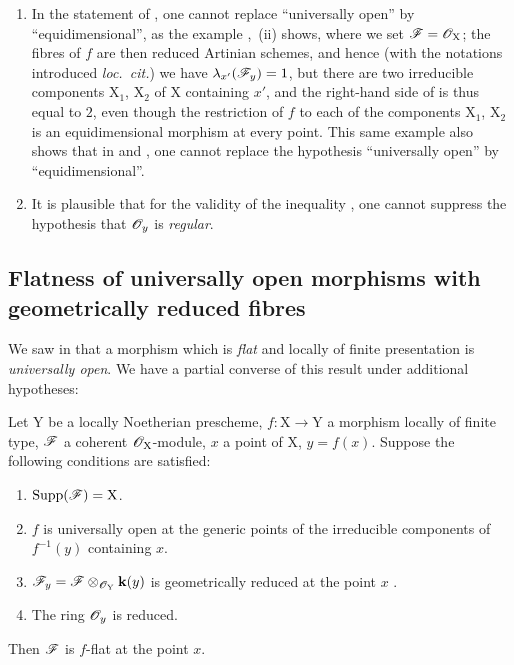 \begin{remarks}[15.1.4]
\label{IV.15.1.4}
\begin{enumerate}[label=(\roman*)]
  \item In the statement of , one cannot replace ``universally open'' by ``equidimensional'', as the example ,~(ii) shows, where we set $\mathscr{F}=\mathscr{O}_\mathrm{X}$; the fibres of $f$ are then reduced Artinian schemes, and hence (with the notations introduced \emph{loc.\ cit.}) we have $\lambda_{x'}(\mathscr{F}_y)=1$, but there are two irreducible components $\mathrm{X}_1$, $\mathrm{X}_2$ of $\mathrm{X}$ containing $x'$, and the right-hand side of  is thus equal to $2$, even though the restriction of $f$ to each of the components $\mathrm{X}_1$, $\mathrm{X}_2$ is an equidimensional morphism at every point.
This same example also shows that in  and , one cannot replace the hypothesis ``universally open'' by ``equidimensional''.
  \item It is plausible that for the validity of the inequality , one cannot suppress the hypothesis that $\mathscr{O}_y$ is \emph{regular}.
\end{enumerate}
\end{remarks}

\subsection{Flatness of universally open morphisms with geometrically reduced fibres}
\label{subsection:IV.15.2}

\begin{env}[15.2.1]
\label{IV.15.2.1}
We saw in  that a morphism which is \emph{flat} and locally of finite presentation is \emph{universally open}.
We have a partial converse of this result under additional hypotheses:
\end{env}

\begin{theorem}[15.2.2]
\label{IV.15.2.2}
Let $\mathrm{Y}$ be a locally Noetherian prescheme, $f:\mathrm{X}\to\mathrm{Y}$ a morphism locally of finite type, $\mathscr{F}$ a coherent $\mathscr{O}_\mathrm{X}$-module, $x$ a point of $\mathrm{X}$, $y=f(x)$.
Suppose the following conditions are satisfied:
\begin{enumerate}[label=(\roman*)]
  \item $\operatorname{Supp}(\mathscr{F})=\mathrm{X}$.
  \item $f$ is universally open at the generic points of the irreducible components of $f^{-1}(y)$ containing $x$.
  \item $\mathscr{F}_y=\mathscr{F}\otimes_{\mathscr{O}_\mathrm{Y}}\mathbf{k}(y)$ is geometrically reduced at the point $x$ .
  \item The ring $\mathscr{O}_y$ is reduced.
\end{enumerate}
Then $\mathscr{F}$ is $f$-flat at the point $x$.
\end{theorem}

